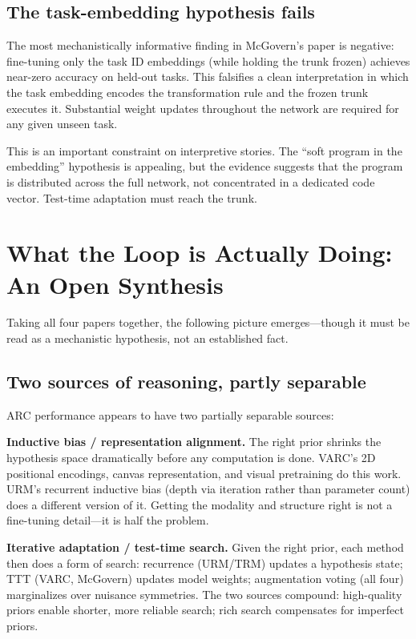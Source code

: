 \documentclass[11pt, letterpaper]{article}
\begin{document}
\subsection{The task-embedding hypothesis fails}

The most mechanistically informative finding in McGovern's paper is negative:
fine-tuning only the task ID embeddings (while holding the trunk frozen)
achieves near-zero accuracy on held-out tasks. This falsifies a clean
interpretation in which the task embedding encodes the transformation rule
and the frozen trunk executes it. Substantial weight updates throughout the
network are required for any given unseen task.

This is an important constraint on interpretive stories. The ``soft program
in the embedding'' hypothesis is appealing, but the evidence suggests that
the program is distributed across the full network, not concentrated in a
dedicated code vector. Test-time adaptation must reach the trunk.

\section{What the Loop is Actually Doing: An Open Synthesis}
\label{sec:synthesis}

Taking all four papers together, the following picture emerges---though it
must be read as a mechanistic hypothesis, not an established fact.

\subsection{Two sources of reasoning, partly separable}

ARC performance appears to have two partially separable sources:

\textbf{Inductive bias / representation alignment.} The right prior shrinks
the hypothesis space dramatically before any computation is done. VARC's
2D positional encodings, canvas representation, and visual pretraining do
this work. URM's recurrent inductive bias (depth via iteration rather than
parameter count) does a different version of it. Getting the modality and
structure right is not a fine-tuning detail---it is half the problem.

\textbf{Iterative adaptation / test-time search.} Given the right prior,
each method then does a form of search: recurrence (URM/TRM) updates
a hypothesis state; TTT (VARC, McGovern) updates model weights; augmentation
voting (all four) marginalizes over nuisance symmetries. The two sources
compound: high-quality priors enable shorter, more reliable search; rich
search compensates for imperfect priors.
\end{document}
